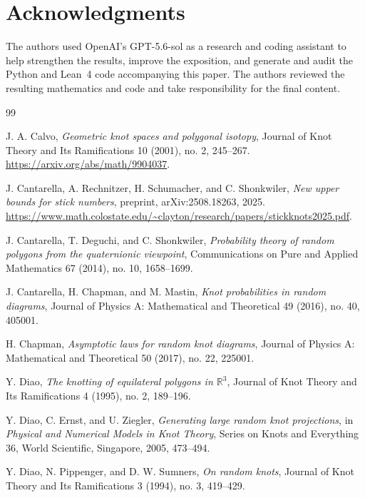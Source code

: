 \documentclass[11pt]{amsart}
\theoremstyle{remark}
\newcommand{\Rbb}{\mathbb{R}}
\newcommand{\1}{\mathbf{1}}
\begin{document}
\section*{Acknowledgments}

The authors used OpenAI's GPT-5.6-sol as a research and coding assistant to
help strengthen the results, improve the exposition, and generate and audit
the Python and Lean~4 code accompanying this paper.  The authors reviewed the
resulting mathematics and code and take responsibility for the final content.

\begin{thebibliography}{99}

J. A. Calvo,
\emph{Geometric knot spaces and polygonal isotopy},
Journal of Knot Theory and Its Ramifications 10 (2001), no. 2, 245--267.
\url{https://arxiv.org/abs/math/9904037}.

J. Cantarella, A. Rechnitzer, H. Schumacher, and C. Shonkwiler,
\emph{New upper bounds for stick numbers},
preprint, arXiv:2508.18263, 2025.
\url{https://www.math.colostate.edu/~clayton/research/papers/stickknots2025.pdf}.

J. Cantarella, T. Deguchi, and C. Shonkwiler,
\emph{Probability theory of random polygons from the quaternionic viewpoint},
Communications on Pure and Applied Mathematics 67 (2014), no. 10, 1658--1699.

J. Cantarella, H. Chapman, and M. Mastin,
\emph{Knot probabilities in random diagrams},
Journal of Physics A: Mathematical and Theoretical 49 (2016), no. 40, 405001.

H. Chapman,
\emph{Asymptotic laws for random knot diagrams},
Journal of Physics A: Mathematical and Theoretical 50 (2017), no. 22, 225001.

Y. Diao,
\emph{The knotting of equilateral polygons in \(\Rbb^3\)},
Journal of Knot Theory and Its Ramifications 4 (1995), no. 2, 189--196.

Y. Diao, C. Ernst, and U. Ziegler,
\emph{Generating large random knot projections},
in \emph{Physical and Numerical Models in Knot Theory}, Series on Knots and
Everything 36, World Scientific, Singapore, 2005, 473--494.

Y. Diao, N. Pippenger, and D. W. Sumners,
\emph{On random knots},
Journal of Knot Theory and Its Ramifications 3 (1994), no. 3, 419--429.


\end{thebibliography}
\end{document}
